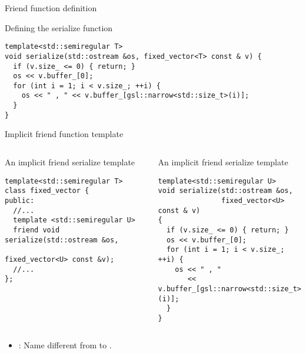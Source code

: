 \begin{frame}[t,fragile]{Friend function definition}
\begin{block}{Defining the serialize function}
\begin{lstlisting}
template<std::semiregular T>
void serialize(std::ostream &os, fixed_vector<T> const & v) {
  if (v.size_ <= 0) { return; }
  os << v.buffer_[0];
  for (int i = 1; i < v.size_; ++i) {
    os << " , " << v.buffer_[gsl::narrow<std::size_t>(i)];
  }
}
\end{lstlisting}
\end{block}
\end{frame}

\begin{frame}[t,fragile]{Implicit friend function template}
\begin{columns}[T]

\begin{block}{An implicit friend serialize template}
\begin{lstlisting}
template<std::semiregular T>
class fixed_vector {
public:
  //...
  template <std::semiregular U>
  friend void serialize(std::ostream &os, 
                        fixed_vector<U> const &v);
  //...
};  
\end{lstlisting}
\end{block}

\begin{block}{An implicit friend serialize template}
\begin{lstlisting}
template<std::semiregular U>
void serialize(std::ostream &os, 
               fixed_vector<U> const & v) 
{
  if (v.size_ <= 0) { return; }
  os << v.buffer_[0];
  for (int i = 1; i < v.size_; ++i) {
    os << " , " 
       << v.buffer_[gsl::narrow<std::size_t>(i)];
  }
}
\end{lstlisting}
\end{block}

\end{columns}

\begin{itemize}
  \item {}: Name  different from  to .
\end{itemize}

\end{frame}

